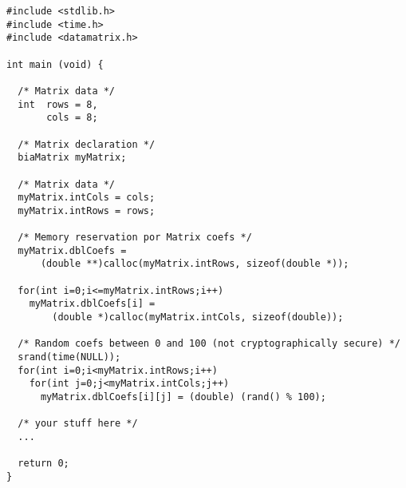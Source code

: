 %
\begin{verbatim}
#include <stdlib.h>
#include <time.h>
#include <datamatrix.h>

int main (void) {

  /* Matrix data */
  int  rows = 8,
       cols = 8;

  /* Matrix declaration */
  biaMatrix myMatrix;

  /* Matrix data */
  myMatrix.intCols = cols;
  myMatrix.intRows = rows;

  /* Memory reservation por Matrix coefs */
  myMatrix.dblCoefs = 
      (double **)calloc(myMatrix.intRows, sizeof(double *));

  for(int i=0;i<=myMatrix.intRows;i++)
    myMatrix.dblCoefs[i] = 
        (double *)calloc(myMatrix.intCols, sizeof(double));

  /* Random coefs between 0 and 100 (not cryptographically secure) */
  srand(time(NULL));
  for(int i=0;i<myMatrix.intRows;i++)
    for(int j=0;j<myMatrix.intCols;j++)
      myMatrix.dblCoefs[i][j] = (double) (rand() % 100);

  /* your stuff here */
  ...

  return 0;
}
\end{verbatim}
